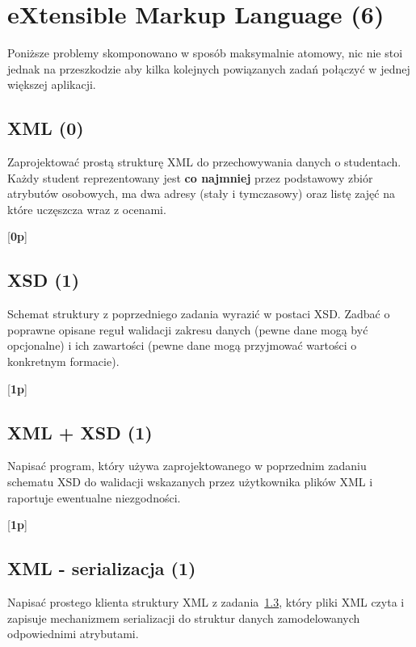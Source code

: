 ﻿\section{eXtensible Markup Language (6)}

  Poniższe problemy skomponowano w sposób maksymalnie atomowy, nic nie stoi jednak na przeszkodzie
	aby kilka kolejnych powiązanych zadań połączyć w jednej większej aplikacji.

\subsection{XML (0)}

      Zaprojektować prostą strukturę XML do przechowywania danych o studentach. 
\label{xml1}  
      Każdy student reprezentowany jest {\bf co najmniej} przez podstawowy zbiór atrybutów osobowych,
      ma dwa adresy (stały i tymczasowy) oraz listę zajęć na które uczęszcza wraz z ocenami.
      
      [{\bf 0p}]

\subsection{XSD (1)}

      Schemat struktury z poprzedniego zadania wyrazić w postaci XSD. Zadbać o poprawne opisane reguł walidacji
\label{xsd}	  
      zakresu danych (pewne dane mogą być opcjonalne) i ich zawartości (pewne dane mogą przyjmować 
      wartości o konkretnym formacie).

      [{\bf 1p}]

\subsection{XML + XSD (1)}
\label{XML_XSD}

      Napisać program, który używa zaprojektowanego w poprzednim zadaniu schematu XSD do walidacji wskazanych
\label{xml_xsd}	  
      przez użytkownika plików XML i raportuje ewentualne niezgodności.
      
      [{\bf 1p}]

\subsection{XML - serializacja (1)}

      Napisać prostego klienta struktury XML z zadania~\ref{XML_XSD}, który pliki XML czyta i zapisuje 
\label{xml_serializacja}	  
      mechanizmem serializacji do struktur danych zamodelowanych odpowiednimi atrybutami.
      
